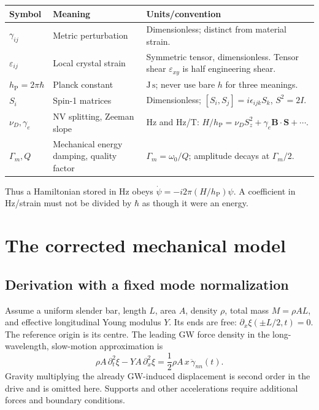 \documentclass[a4paper,11pt]{article}
\newcommand{\hp}{h_{\mathrm P}}
\newcommand{\eps}{\varepsilon}
\begin{document}
\begin{tabularx}{\textwidth}{@{}P{31mm}XX@{}}
\toprule
Symbol & Meaning & Units/convention\\
\midrule
$\gamma_{ij}$ & Metric perturbation & Dimensionless; distinct from material strain.\\
$\eps_{ij}$ & Local crystal strain & Symmetric tensor, dimensionless. Tensor shear $\eps_{xy}$ is half engineering shear.\\
$\hp=2\pi\hbar$ & Planck constant & $\mathrm{J\,s}$; never use bare $h$ for three meanings.\\
$S_i$ & Spin-1 matrices & Dimensionless; $[S_i,S_j]=i\epsilon_{ijk}S_k$, $S^2=2I$.\\
$\nu_D,\gamma_e$ & NV splitting, Zeeman slope & Hz and Hz/T: $H/\hp=\nu_DS_z^2+\gamma_e\bm B\cdot\bm S+\cdots$.\\
$\Gamma_m, Q$ & Mechanical energy damping, quality factor & $\Gamma_m=\omega_0/Q$; amplitude decays at $\Gamma_m/2$.\\
\bottomrule
\end{tabularx}

Thus a Hamiltonian stored in Hz obeys $\dot\psi=-i2\pi(H/\hp)\psi$. A coefficient in Hz/strain must not be divided by $\hbar$ as though it were an energy.

\section{The corrected mechanical model}
\label{sec:mechanics}

\subsection{Derivation with a fixed mode normalization}

Assume a uniform slender bar, length $L$, area $A$, density $\rho$, total mass $M=\rho AL$, and effective longitudinal Young modulus $Y$. Its ends are free: $\partial_x\xi(\pm L/2,t)=0$. The reference origin is its centre. The leading GW force density in the long-wavelength, slow-motion approximation is
\begin{equation}
 \rho A\,\partial_t^2\xi-YA\,\partial_x^2\xi
 =\frac12\rho A\,x\,\ddot\gamma_{nn}(t).
 \label{eq:pde}
\end{equation}
Gravity multiplying the already GW-induced displacement is second order in the drive and is omitted here. Supports and other accelerations require additional forces and boundary conditions.
\end{document}
